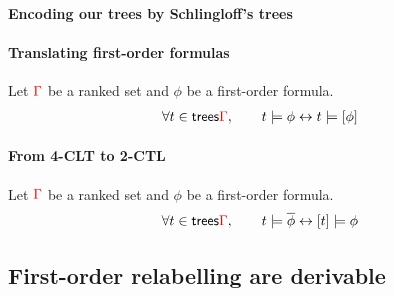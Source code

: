 \paragraph*{Encoding our trees by Schlingloff's trees}
\paragraph*{Translating first-order formulas}
\begin{lemma} Let ${\color{red}{\Gamma}}$ be a ranked set and $\phi$ be a first-order formula.
\begin{align*}
\forall t\in \mathsf {trees} {\color{red}{\Gamma}}, \qquad t\models \phi \leftrightarrow t \models [\phi]
\end{align*} 
\end{lemma}

\paragraph*{From 4-CLT to 2-CTL}
 \begin{lemma} Let ${\color{red}{\Gamma}}$ be a ranked set and $\phi$ be a first-order formula.
\begin{align*}
\forall t\in \mathsf {trees} {\color{red}{\Gamma}}, \qquad t\models \overline{\phi} \leftrightarrow [t] \models \phi
\end{align*} 
\end{lemma}

\subsection{First-order relabelling are derivable}\label{sec:relabeling}

